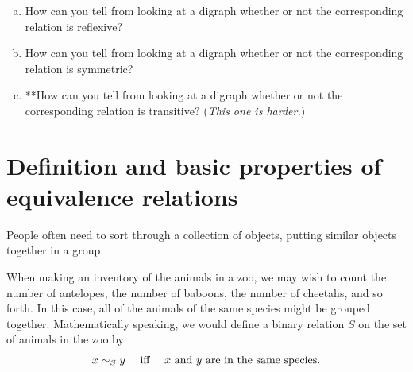\begin{exercise}{21}
\begin{enumerate}[(a)]
\item
How can you tell from looking at a digraph whether or not the corresponding relation is reflexive?
\item
How can you tell from looking at a digraph whether or not the corresponding relation is symmetric? 
\item
**How can you tell from looking at a digraph whether or not the corresponding relation is transitive? (\emph{This one is harder.})
\end{enumerate}
\end{exercise}





\section{Definition and basic properties of equivalence relations} \label{EquivalenceRelationsDefnSect}

People often need to sort through a collection of objects, putting similar objects together in a group. 

\begin{eg} \label{EquivRelZooEg}
When making an inventory of the animals in a zoo, we may wish to count the number of antelopes, the number of baboons, the number of cheetahs, and so forth. In this case, all of the animals of the same species might be grouped together. Mathematically speaking, we would define a binary relation $S$ on the set of animals in the zoo by 
	$$ \text{$x \sim_S y$ \quad iff \quad $x$ and $y$ are in the same species} .$$
\end{eg}


